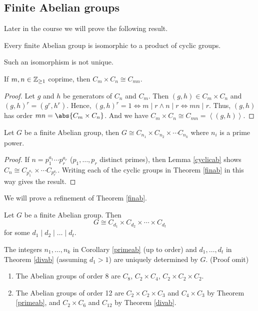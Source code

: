 \subsection{Finite Abelian groups}
Later in the course we will prove the following result.
\begin{theorem}{}{}
    Every finite Abelian group is isomorphic to a product of cyclic groups.
    \label{finab}
\end{theorem}
\begin{note}
    Such an isomorphism is not unique.
\end{note}
\begin{lemma}{}{}
    If \(m, n \in \mathbb{\MakeUppercase{Z}}_{\geq 1}\) coprime, then \(C_m \times C_n \cong C_{mn}\).
    \label{cyclicmn}
\end{lemma}
\begin{proof}
    Let \(g\) and \(h\) be generators of \(C_n\) and \(C_m\). Then \((g, h) \in C_m \times C_n\) and \((g, h)^r = (g^r, h^r)\). Hence, \((g, h)^r = 1 \iff m \mid r \land n \mid r \iff mn \mid r\). Thus, \((g,h)\) has order \(mn = \abs{C_m \times C_n} \). And we have \( C_m \times C_n \cong C_{mn} = \left\langle(g,h)\right\rangle \).
\end{proof}
\begin{corollary}{}{}
    Let \(G\) be a finite Abelian group, then \(G \cong C_{n_1} \times C_{n_2} \times \cdots C_{n_k}\) where \(n_i\) is a prime power.
    \label{primeab}
\end{corollary}
\begin{proof}
    If \(n = p_1^{a_1}\cdots p_r^{a_r}\) (\(p_1,\ldots,p_r\) distinct primes), then Lemma \eqref{cyclicab} shows \(C_n \cong C_{p_1^{a_1}}\times \cdots C_{p_r^{a_r}}\). Writing each of the cyclic groups in Theorem \eqref{finab} in this way gives the result.
\end{proof}
We will prove a refinement of Theorem \eqref{finab}.
\begin{theorem}{}{}
    \label{divab}
    Let \(G\) be a finite Abelian group. Then
    \[G \cong C_{d_1}\times C_{d_2} \times \cdots \times C_{d_t}\]
    for some \(d_1 \mid d_2 \mid \dots \mid d_t\).
\end{theorem}
\begin{remark}
    The integers \(n_1, \ldots, n_k\) in Corollary \eqref{primeab} (up to order) and \(d_1, \ldots, d_t\) in Theorem \eqref{divab} (assuming \(d_1 > 1\)) are uniquely determined by \(G\). (Proof omit)
\end{remark}
\begin{example}
    \leavevmode
    \begin{enumerate}
        \item The Abelian groups of order 8 are \(C_8\), \(C_2 \times C_4\), \(C_2 \times C_2 \times C_2\).
        \item The Abelian groups of order 12 are \(C_2 \times C_2 \times C_3\) and \(C_4 \times C_3\) by Theorem \eqref{primeab}, and \(C_2 \times C_6\) and \(C_{12}\) by Theorem \eqref{divab}.
    \end{enumerate}
\end{example}
